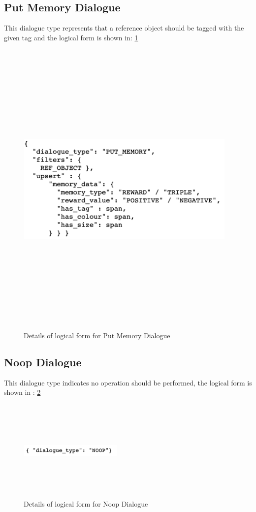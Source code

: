 \subsection{Put Memory Dialogue}
This dialogue type represents that a reference object should be tagged with the given tag and the logical form is shown in: \ref{fig:tag_dict}

\begin{figure}[h]
    \centering
    \includegraphics[width=10.8cm,height=15cm,keepaspectratio]{figures/tag.png}
    \caption{Details of logical form for Put Memory Dialogue}
    \label{fig:tag_dict}
\end{figure}


\subsection{ Noop Dialogue}
This dialogue type indicates no operation should be performed, the logical form is shown in : \ref{fig:noop_dict}
\begin{figure}[h]
	\centering
    \includegraphics[width=5cm,height=5cm,keepaspectratio]{figures/noop.png}
    \caption{Details of logical form for Noop Dialogue}
    \label{fig:noop_dict}
\end{figure}

